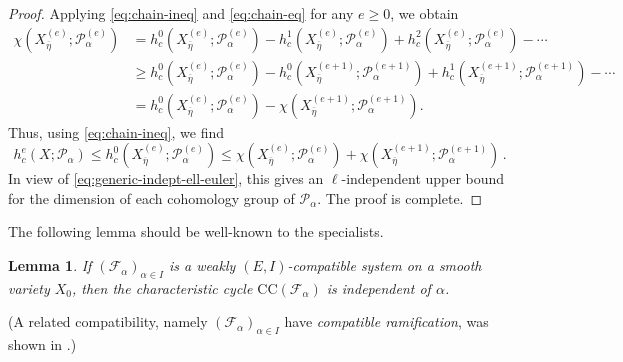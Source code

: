 \documentclass[english]{smfart}
\renewcommand{\leq}{\leqslant}
\renewcommand{\geq}{\geqslant}
\theoremstyle{remark}
\theoremstyle{plain}
\newtheorem{lemma}[remark]{Lemma}
\theoremstyle{definition}
\numberwithin{equation}{remark}
\theoremstyle{void}
\begin{document}
\begin{proof}
Applying \eqref{eq:chain-ineq} and \eqref{eq:chain-eq} for any \(e \geq 0\), we obtain
\begin{align*}
  \chi(X^{(e)}_{\overline{\eta}}; \mathcal{P}^{(e)}_{\alpha})
  &= h^{0}_{c}(X^{(e)}_{\overline{\eta}}; \mathcal{P}^{(e)}_{\alpha}) - h^{1}_{c}(X^{(e)}_{\overline{\eta}}; \mathcal{P}^{(e)}_{\alpha}) + h^{2}_{c}(X^{(e)}_{\overline{\eta}}; \mathcal{P}^{(e)}_{\alpha}) - \cdots \\
  &\geq h^{0}_{c}(X^{(e)}_{\overline{\eta}}; \mathcal{P}^{(e)}_{\alpha}) - h^{0}_{c}(X^{(e+1)}_{\overline{\eta}}; \mathcal{P}^{(e+1)}_{\alpha}) + h^{1}_{c}(X^{(e+1)}_{\overline{\eta}}; \mathcal{P}^{(e+1)}_{\alpha}) - \cdots \\
  &= h^{0}_{c}(X^{(e)}_{\overline{\eta}}; \mathcal{P}^{(e)}_{\alpha}) - \chi(X^{(e+1)}_{\overline{\eta}}; \mathcal{P}^{(e+1)}_{\alpha}).
\end{align*}
Thus, using \eqref{eq:chain-ineq}, we find
\[
h^{e}_{c}(X; \mathcal{P}_{\alpha})
\leq h^{0}_{c}(X^{(e)}_{\overline{\eta}}; \mathcal{P}^{(e)}_{\alpha})
\leq \chi(X^{(e)}_{\overline{\eta}}; \mathcal{P}^{(e)}_{\alpha}) + \chi(X^{(e+1)}_{\overline{\eta}}; \mathcal{P}^{(e+1)}_{\alpha})\,.
\]
In view of \eqref{eq:generic-indept-ell-euler},
this gives an \(\ell\)-independent upper bound for the dimension of
each cohomology group of \(\mathcal{P}_{\alpha}\). The proof is
complete.
\end{proof}

The following lemma should be well-known to the specialists.

\begin{lemma}\label{lemma:cc-independent-of-ell}
If \((\mathcal{F}_{\alpha})_{\alpha\in I}\) is a weakly
\((E,I)\)-compatible system on a smooth variety \(X_{0}\), then the
characteristic cycle \(\mathrm{CC}(\mathcal{F}_{\alpha})\) is
independent of \(\alpha\).
\end{lemma}

(A related compatibility,
namely \((\mathcal{F}_{\alpha})_{\alpha\in I}\) have
\emph{compatible ramification}, was shown in
\cite{lu-zheng_compatible-ramification}.)
\end{document}
